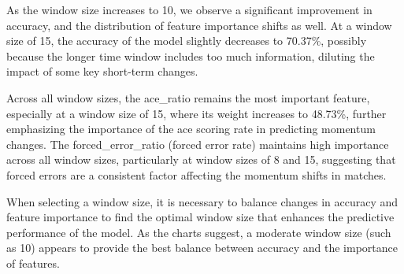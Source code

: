 \documentclass{mcmthesis}
\begin{document}
As the window size increases to 10, we observe a significant improvement in accuracy, and
the distribution of feature importance shifts as well. At a window size of 15, the accuracy of the
model slightly decreases to 70.37\%, possibly because the longer time window includes too much
information, diluting the impact of some key short-term changes.

Across all window sizes, the ace\_ratio remains the most important feature, especially at a
window size of 15, where its weight increases to 48.73\%, further emphasizing the importance of
the ace scoring rate in predicting momentum changes. The forced\_error\_ratio (forced error rate)
maintains high importance across all window sizes, particularly at window sizes of 8 and 15, suggesting that forced errors are a consistent factor affecting the momentum shifts in matches.

When selecting a window size, it is necessary to balance changes in accuracy and feature
importance to find the optimal window size that enhances the predictive performance of the model. As the charts suggest, a moderate window size (such as 10) appears to provide the best balance
between accuracy and the importance of features.
\end{document}
